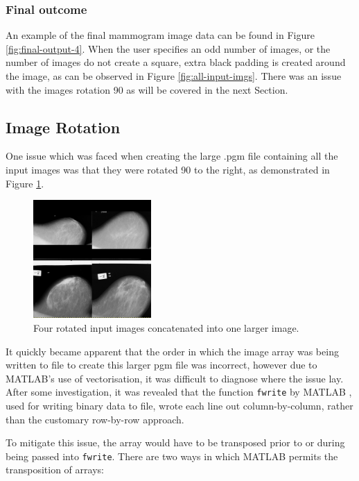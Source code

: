 \subsubsection{Final outcome}

An example of the final mammogram image data can be found in Figure \ref{fig:final-output-4}. When the user specifies an odd number of images, or the number of images do not create a square, extra black padding is created around the image, as can be observed in Figure \ref{fig:all-input-imgs}. There was an issue with the images rotation 90{\degree} as will be covered in the next Section.


\subsection{Image Rotation}
\label{ssec:trans}

One issue which was faced when creating the large .pgm file containing all the input images was that they were rotated 90{\degree} to the right, as demonstrated in Figure \ref{fig:rotated-input}.

\begin{figure}[H]
  \centering
  \includegraphics[width=0.4\textwidth]{Chapter2/technical-img/rotation.png}
  \caption{Four rotated input images concatenated into one larger image.}
  \label{fig:rotated-input}
\end{figure}

It quickly became apparent that the order in which the image array was being written to file to create this larger pgm file was incorrect, however due to MATLAB's use of vectorisation, it was difficult to diagnose where the issue lay. After some investigation, it was revealed that the function \texttt{fwrite} by MATLAB \cite{fwrite}, used for writing binary data to file, wrote each line out column-by-column, rather than the customary row-by-row approach.

To mitigate this issue, the array would have to be transposed prior to or during being passed into \texttt{fwrite}. There are two ways in which MATLAB permits the \gls{transposition} of arrays:

